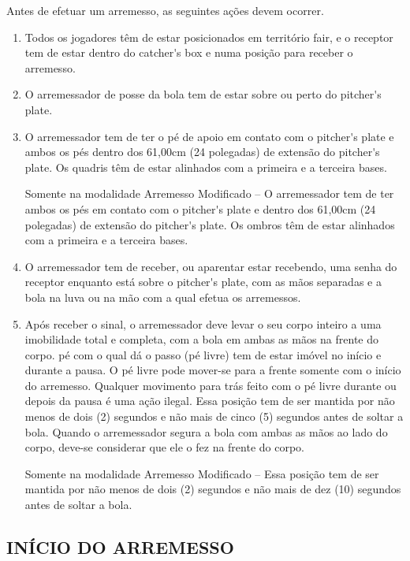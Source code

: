 Antes de efetuar um arremesso, as seguintes ações devem ocorrer.
\begin{enumerate}[label=(\alph*)]
	\item Todos os jogadores têm de estar posicionados em território \gls{fair}, e o receptor  tem de estar dentro do \gls{catcher's box} e numa posição para receber o arremesso.
\item   O arremessador de posse da bola tem de estar sobre ou perto do \gls{pitcher's plate}.
\item   O arremessador tem de ter o pé de apoio em contato com o \gls{pitcher's plate} e ambos os pés dentro dos 61,00cm (24 polegadas) de extensão do \gls{pitcher's plate}. Os quadris têm de estar alinhados com a primeira e a terceira bases.

  Somente na modalidade Arremesso Modificado -- O arremessador tem de ter ambos os pés em contato com o \gls{pitcher's plate} e dentro dos 61,00cm (24 polegadas) de extensão do \gls{pitcher's plate}. Os ombros têm de estar alinhados com a primeira e a terceira bases.

\item  O arremessador tem de receber, ou aparentar estar recebendo, uma senha  do receptor enquanto está sobre o \gls{pitcher's plate}, com as mãos separadas e a  bola na luva ou na mão com a qual efetua os arremessos.

\item  Após receber o sinal, o arremessador deve levar o seu corpo inteiro a uma  imobilidade total e completa, com a bola em ambas as mãos na frente do corpo. pé com o qual dá o passo (pé livre) tem de estar imóvel no início e durante a pausa. O pé livre pode mover-se para a frente somente com o início do arremesso. Qualquer movimento para trás feito com o pé livre durante ou depois da pausa é uma ação ilegal. Essa posição tem de ser mantida por não menos de dois (2) segundos e não mais de cinco (5) segundos antes de soltar a  bola. Quando o arremessador segura a bola com ambas as mãos ao lado do corpo, deve-se considerar que ele o fez na frente do corpo.

 Somente na modalidade Arremesso Modificado -- Essa posição tem de ser mantida por não menos de dois (2) segundos e não mais de dez (10) segundos antes de soltar a bola.
\end{enumerate}

\subsection{INÍCIO DO ARREMESSO}

